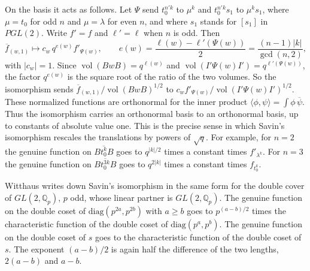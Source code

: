 \documentclass[12pt,letterpaper]{amsart}
\numberwithin{equation}{section}
\theoremstyle{definition}
\theoremstyle{remark}
\DeclareMathOperator{\vol}{vol}
\newcommand{\fbar}{\overline{f}}
\begin{document}
On the basis it acts as follows. Let $\Psi$ send $t_0^{n'k}$ to
$\mu^k$ and $t_0^{n'k}s_1$ to $\mu^ks_1$, where $\mu=t_0$ for odd $n$
and $\mu=\lambda$ for even $n$, and where $s_1$ stands for $[s_1]$ in
$PGL(2)$. Write $f'=f$ and $\ell'=\ell$ when $n$ is odd. Then
\begin{equation}
\label{eq:savinbasis}
\fbar_{(w,1)}\longmapsto c_w\,q^{e(w)}f'_{\Psi(w)},\qquad
e(w)=\frac{\ell(w)-\ell'(\Psi(w))}{2}=\frac{(n-1)|k|}{\gcd(n,2)},
\end{equation}
with $|c_w|=1$. Since $\vol(BwB)=q^{\ell(w)}$ and
$\vol(I'\Psi(w)I')=q^{\ell'(\Psi(w))}$, the factor $q^{e(w)}$ is the
square root of the ratio of the two volumes. So the isomorphism sends
$\fbar_{(w,1)}/\vol(BwB)^{1/2}$ to
$c_wf'_{\Psi(w)}/\vol(I'\Psi(w)I')^{1/2}$. These normalized functions
are orthonormal for the inner product
$\langle\phi,\psi\rangle=\int\phi\,\overline\psi$. Thus the
isomorphism carries an orthonormal basis to an orthonormal basis, up to
constants of absolute value one. This is the precise sense in which
Savin's isomorphism rescales the translations by powers of $\sqrt q$.
For example, for $n=2$ the genuine function on $\overline{Bt_0^kB}$
goes to $q^{|k|/2}$ times a constant times $f'_{\lambda^k}$. For $n=3$
the genuine function on $\overline{Bt_0^{3k}B}$ goes to $q^{2|k|}$
times a constant times $f_{t_0^k}$.

Witthaus \cite[Lemma~6.1]{Wi22} writes down Savin's isomorphism in the
same form for the double cover of $GL(2,\mathbb{Q}_p)$, $p$ odd, whose
linear partner is $GL(2,\mathbb{Q}_p)$. The genuine function on the
double coset of $\mathrm{diag}(p^{2a},p^{2b})$ with $a\geq b$ goes to
$p^{(a-b)/2}$ times the characteristic function of the double coset of
$\mathrm{diag}(p^a,p^b)$. The genuine function on the double coset of
$s$ goes to the characteristic function of the double coset of $s$. The
exponent $(a-b)/2$ is again half the difference of the two lengths,
$2(a-b)$ and $a-b$.
\end{document}
